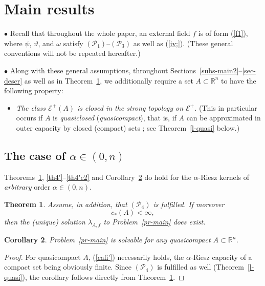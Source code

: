 \documentclass[12pt,a4paper,reqno]{amsart} %
\theoremstyle{lause}
\theoremstyle{maaritelma}
\theoremstyle{lause}
\newtheorem{theorem}{Theorem}[section]
\newtheorem{corollary}[theorem]{Corollary}
\theoremstyle{maaritelma}
\numberwithin{equation}{section}
\begin{document}
\section{Main results}\label{sec-intr2}

$\bullet$ Recall that throughout the whole paper,
an external field $f$ is of form (\ref{f1}), where $\psi$, $\vartheta$, and $\omega$ satisfy $(\mathcal P_1)$--$(\mathcal P_3)$ as well as (\ref{iv;}). (These general conventions will not be repeated hereafter.)

$\bullet$ Along with these general assumptions,  throughout Sections~\ref{subs-main2}--\ref{sec-descr} as well as in Theorem~\ref{th2'}, we additionally require a set $A\subset\mathbb R^n$ to have the following property:
\begin{itemize}
  \item[$(\mathcal P_4)$] {\it The class $\mathcal E^+(A)$ is closed in the strong topology on $\mathcal E^+$.} (This in particular occurs if $A$ is {\it quasiclosed} ({\it quasicompact\/}), that is, if $A$ can be approximated in outer capacity by closed (compact) sets \cite{F71}; see Theorem~\ref{l-quasi} below.)
\end{itemize}

\subsection{The case of $\alpha\in(0,n)$}\label{subs-main} Theorems~\ref{th2'}, \ref{th4'}--\ref{th4'c2} and Corollary~\ref{qcomp} do hold for the $\alpha$-Riesz kernels of {\it arbitrary} order $\alpha\in(0,n)$.

\begin{theorem}\label{th2'} Assume, in addition, that $(\mathcal P_4)$ is fulfilled. If moreover
\begin{equation}\label{cafi'}
c_*(A)<\infty,
\end{equation}
then the {\rm(}unique{\rm)} solution $\lambda_{A,f}$ to Problem~{\rm\ref{pr-main}} does exist.\end{theorem}

\begin{corollary}\label{qcomp}
Problem~{\rm\ref{pr-main}} is solvable for any quasicompact $A\subset\mathbb R^n$.
\end{corollary}

\begin{proof}
For quasicompact $A$, (\ref{cafi'}) necessarily holds, the $\alpha$-Riesz capacity of a compact set being obviously finite. Since
$(\mathcal P_4)$ is fulfilled as well (Theorem~\ref{l-quasi}), the corollary follows directly from Theorem~\ref{th2'}.
\end{proof}
\end{document}
